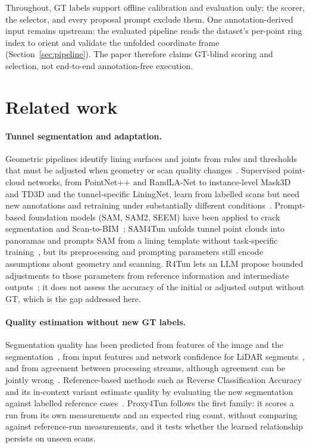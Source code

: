 \documentclass[a4paper,fleqn]{cas-dc}
\begin{document}
Throughout, GT labels support offline calibration and evaluation only; the scorer, the selector, and every proposal prompt exclude them. One annotation-derived input remains upstream: the evaluated pipeline reads the dataset's per-point ring index to orient and validate the unfolded coordinate frame (Section~\ref{sec:pipeline}). The paper therefore claims GT-blind scoring and selection, not end-to-end annotation-free execution.

\section{Related work}
\label{sec:related}

\paragraph{Tunnel segmentation and adaptation.}
Geometric pipelines identify lining surfaces and joints from rules and thresholds that must be adjusted when geometry or scan quality changes~\cite{huang2021bim,weidner2024generalized,wang2025automated}. Supervised point-cloud networks, from PointNet++ and RandLA-Net to instance-level Mask3D and TD3D and the tunnel-specific LiningNet, learn from labelled scans but need new annotations and retraining under substantially different conditions~\cite{qi2017pointnet,hu2020randla,schult2023mask3d,kolodiazhnyi2024td3d,lin2025liningnet,su2024review,cha2024deep}. Prompt-based foundation models (SAM, SAM2, SEEM) have been applied to crack segmentation and Scan-to-BIM~\cite{kirillov2023sam,ravi2024sam2,zou2023segment,ge2024cracksam,ye2024sam,wang2024omni,pan2024zero,ye2026maintenance}; SAM4Tun unfolds tunnel point clouds into panoramas and prompts SAM from a lining template without task-specific training~\cite{ye2025sam4tun}, but its preprocessing and prompting parameters still encode assumptions about geometry and scanning. R4Tun lets an LLM propose bounded adjustments to those parameters from reference information and intermediate outputs~\cite{taoR4Tun}; it does not assess the accuracy of the initial or adjusted output without GT, which is the gap addressed here.

\paragraph{Quality estimation without new GT labels.}
Segmentation quality has been predicted from features of the image and the segmentation~\cite{kohlberger2012evaluating,robinson2018segmentationQuality}, from input features and network confidence for LiDAR segments~\cite{colling2021lidarmetaseg}, and from agreement between processing streams, although agreement can be jointly wrong~\cite{bogdoll2025labelfree}. Reference-based methods such as Reverse Classification Accuracy and its in-context variant estimate quality by evaluating the new segmentation against labelled reference cases~\cite{valindria2017rca,cosarinsky2026conficrca}. Proxy4Tun follows the first family: it scores a run from its own measurements and an expected ring count, without comparing against reference-run measurements, and it tests whether the learned relationship persists on unseen scans.
\end{document}
